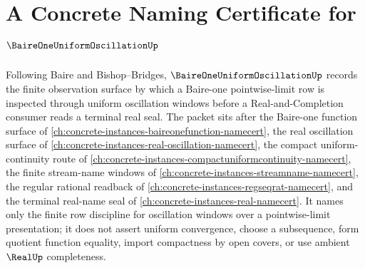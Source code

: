 \chapter{A Concrete Naming Certificate for $\BaireOneUniformOscillationUp$}
\label{ch:concrete-instances-baire-one-uniform-oscillation-namecert}

Following Baire and Bishop--Bridges, $\BaireOneUniformOscillationUp$ records the finite observation surface by which a Baire-one pointwise-limit row is inspected through uniform oscillation windows before a Real-and-Completion consumer reads a terminal real seal. The packet sits after the Baire-one function surface of \autoref{ch:concrete-instances-baireonefunction-namecert}, the real oscillation surface of \autoref{ch:concrete-instances-real-oscillation-namecert}, the compact uniform-continuity route of \autoref{ch:concrete-instances-compactuniformcontinuity-namecert}, the finite stream-name windows of \autoref{ch:concrete-instances-streamname-namecert}, the regular rational readback of \autoref{ch:concrete-instances-regseqrat-namecert}, and the terminal real-name seal of \autoref{ch:concrete-instances-real-namecert}. It names only the finite row discipline for oscillation windows over a pointwise-limit presentation; it does not assert uniform convergence, choose a subsequence, form quotient function equality, import compactness by open covers, or use ambient $\RealUp$ completeness.

